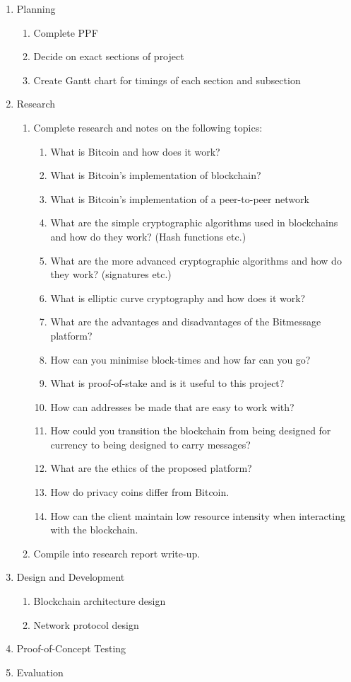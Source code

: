 \documentclass{article}
\begin{document}
\begin{enumerate}
    \item Planning
    \begin{enumerate}
        \item Complete PPF
        \item Decide on exact sections of project
        \item Create Gantt chart for timings of each section and subsection
    \end{enumerate}
    \item Research
    \begin{enumerate}
        \item Complete research and notes on the following topics:
        \begin{enumerate}
            \item What is Bitcoin and how does it work?
            \item What is Bitcoin's implementation of blockchain?
            \item What is Bitcoin's implementation of a peer-to-peer network
            \item What are the simple cryptographic algorithms used in blockchains and how do they work? (Hash functions etc.)
            \item What are the more advanced cryptographic algorithms and how do they work? (signatures etc.)
            \item What is elliptic curve cryptography and how does it work?
            \item What are the advantages and disadvantages of the Bitmessage platform?
            \item How can you minimise block-times and how far can you go?
            \item What is proof-of-stake and is it useful to this project?
            \item How can addresses be made that are easy to work with?
            \item How could you transition the blockchain from being designed for currency to being designed to carry messages?
            \item What are the ethics of the proposed platform?
            \item How do privacy coins differ from Bitcoin.
            \item How can the client maintain low resource intensity when interacting with the blockchain.
        \end{enumerate}
        \item Compile into research report write-up.
    \end{enumerate}
    \item Design and Development
    \begin{enumerate}
        \item Blockchain architecture design
        \item Network protocol design
    \end{enumerate}
    \item Proof-of-Concept Testing
    \item Evaluation
\end{enumerate}
\end{document}
